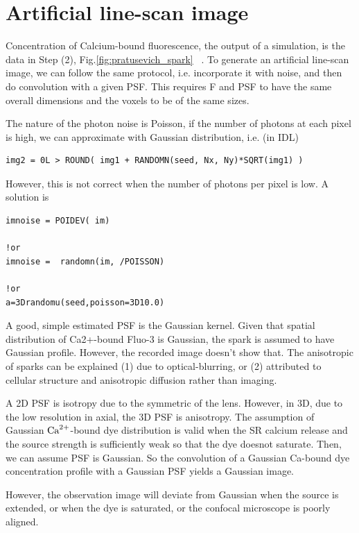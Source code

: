 \section{Artificial line-scan image}
\label{sec:artificial-line-scan}

Concentration of Calcium-bound fluorescence, the output of a simulation, is the
data in Step (2), Fig.\ref{fig:pratusevich_spark} ~\citep{pratusevich1996}. To
generate an artificial line-scan image, we can follow the same protocol, i.e.
incorporate it with noise, and then do convolution with a given PSF. This
requires F and PSF to have the same overall dimensions and the voxels to be of
the same sizes.

The nature of the photon noise is Poisson, if the number of photons at each
pixel is high, we can approximate with Gaussian distribution, i.e. (in IDL)
\begin{verbatim}
img2 = 0L > ROUND( img1 + RANDOMN(seed, Nx, Ny)*SQRT(img1) )
\end{verbatim}
However, this is not correct when the number of photons per pixel is low. A
solution is
\begin{verbatim}
imnoise = POIDEV( im)

!or
imnoise =  randomn(im, /POISSON)

!or
a=3Drandomu(seed,poisson=3D10.0)
\end{verbatim}

A good, simple estimated PSF is the Gaussian kernel. Given that spatial
distribution of Ca2+-bound Fluo-3 is Gaussian, the spark is assumed to have
Gaussian profile. However, the recorded image doesn't show that.
The anisotropic of sparks can be explained (1) due to optical-blurring, or (2)
attributed to cellular structure and anisotropic diffusion rather than imaging.

\begin{framed}

A 2D PSF is isotropy due to the symmetric of the lens. However, in 3D, due to
the low resolution in axial, the 3D PSF is anisotropy.
The assumption of Gaussian ${\text{Ca}^{2+}}$-bound dye distribution is valid when the SR
  calcium release and the source strength is sufficiently weak so that the dye
  doesnot saturate. Then, we can assume PSF is Gaussian. So the convolution of a
  Gaussian Ca-bound dye concentration profile with a Gaussian PSF yields a
  Gaussian image.

  However, the observation image will deviate from Gaussian when the
  source is extended, or when the dye is saturated, or the confocal
  microscope is poorly aligned.
\end{framed}

